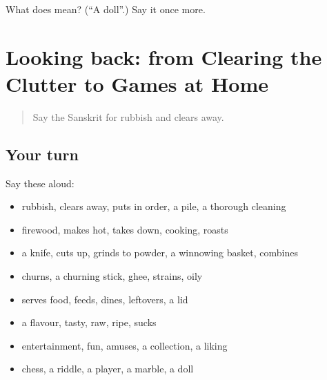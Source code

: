 \begin{tcolorbox}[breakable,colback=teal!4,colframe=teal!35!black,title={Before you move on}]
What does  mean? (\textquotedblleft{}A doll\textquotedblright{}.) Say it once more.
\end{tcolorbox}
\section[(dialogue)]{Looking back: from Clearing the Clutter to Games at Home}

\label{lesson:SA-R517-review-510-517}



\begin{quote}
Say the Sanskrit for rubbish and clears away.
\end{quote}

\subsection*{Your turn}
Say these aloud:

\begin{itemize}
\raggedright
  \item rubbish, clears away, puts in order, a pile, a thorough cleaning
  \item firewood, makes hot, takes down, cooking, roasts
  \item a knife, cuts up, grinds to powder, a winnowing basket, combines
  \item churns, a churning stick, ghee, strains, oily
  \item serves food, feeds, dines, leftovers, a lid
  \item a flavour, tasty, raw, ripe, sucks
  \item entertainment, fun, amuses, a collection, a liking
  \item chess, a riddle, a player, a marble, a doll
\end{itemize}

